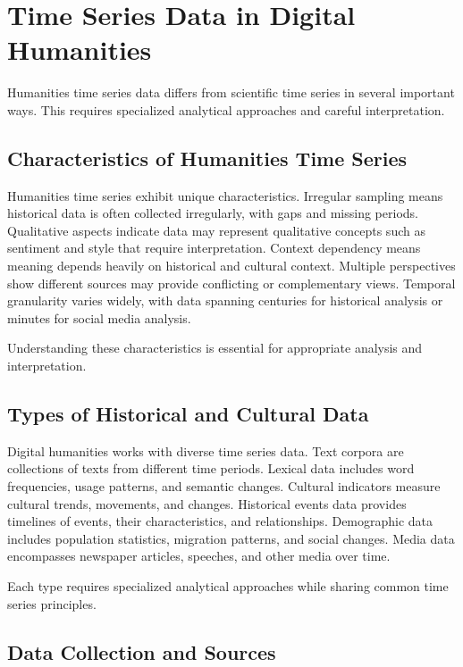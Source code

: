 \section{Time Series Data in Digital Humanities}

Humanities time series data differs from scientific time series in several important ways. This requires specialized analytical approaches and careful interpretation.

\subsection{Characteristics of Humanities Time Series}

Humanities time series exhibit unique characteristics. Irregular sampling means historical data is often collected irregularly, with gaps and missing periods. Qualitative aspects indicate data may represent qualitative concepts such as sentiment and style that require interpretation. Context dependency means meaning depends heavily on historical and cultural context. Multiple perspectives show different sources may provide conflicting or complementary views. Temporal granularity varies widely, with data spanning centuries for historical analysis or minutes for social media analysis.

Understanding these characteristics is essential for appropriate analysis and interpretation.

\subsection{Types of Historical and Cultural Data}

Digital humanities works with diverse time series data. Text corpora are collections of texts from different time periods. Lexical data includes word frequencies, usage patterns, and semantic changes. Cultural indicators measure cultural trends, movements, and changes. Historical events data provides timelines of events, their characteristics, and relationships. Demographic data includes population statistics, migration patterns, and social changes. Media data encompasses newspaper articles, speeches, and other media over time.

Each type requires specialized analytical approaches while sharing common time series principles.

\subsection{Data Collection and Sources}

